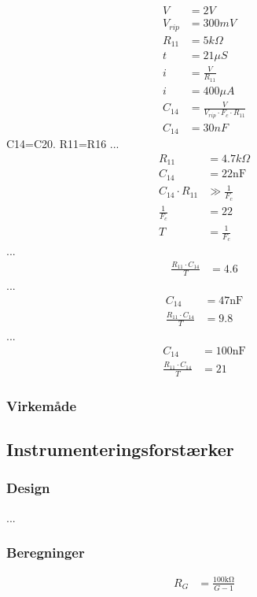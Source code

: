 \begin{align}
	V & = 2V \\
	V_{rip} & = 300mV \\
	R_{11} & = 5k \Omega \\
	t & = 21 \mu S \\
	i & = \frac{V}{R_{11}} \\
	i & = 400 \mu A \\
	C_{14} & = \frac{V}{V_{rip} \cdot F_c \cdot R_{11}}\\
		C_{14} & = 30nF
\end{align}
	C14=C20. R11=R16
...
\begin{align}
		R_{11} & = 4.7k \Omega \nonumber \\
		C_{14} & = 22 \si{\nano\farad} \nonumber \\
		C_{14} \cdot R_{11} & \gg \frac{1}{F_c} \\
		\frac{1}{F_c} & = 22 \\
		T & = \frac{1}{F_c}
\end{align}
...
	\begin{align}
		\frac{R_{11} \cdot C_{14}}{T} & = 4.6
	\end{align}
...
\begin{align}
	C_{14} & = 47 \si{\nano\farad} \nonumber \\
	\frac{R_{11} \cdot C_{14}}{T} & = 9.8
	\end{align}
...
\begin{align}
	C_{14} & = 100 \si{\nano\farad} \\
	\frac{R_{11} \cdot C_{14}}{T} & = 21
	\end{align}
\subsubsection{Virkemåde}

\subsection{Instrumenteringsforstærker}

\subsubsection{Design}
...

\subsubsection{Beregninger}

\begin{align}
	R_G & = \frac{100 \si{\kilo\ohm}}{G-1} 
	\end{align}

